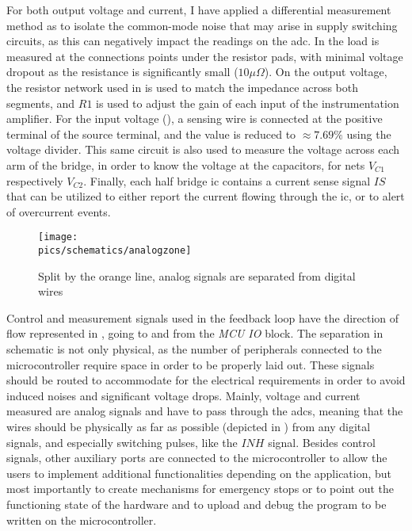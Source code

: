For both output voltage and current, I have applied a differential measurement method as to isolate the common-mode noise that may arise in supply switching circuits, as this can negatively impact the readings on the \gls{adc}.
In  the load is measured at the connections points under the resistor pads, with minimal voltage dropout as the resistance is significantly small ($10\mu \Omega$).
On the output voltage, the resistor network used in  is used to match the impedance across both segments, and $R1$ is used to adjust the gain of each input of the instrumentation amplifier.
For the input voltage (), a sensing wire is connected at the positive terminal of the source terminal, and the value is reduced to $\approx 7.69\%$ using the voltage divider.
This same circuit is also used to measure the voltage across each arm of the bridge, in order to know the voltage at the capacitors, for nets $V_{C1}$ respectively $V_{C2}$.
Finally, each half bridge \gls{ic} contains a current sense signal $IS$ that can be utilized to either report the current flowing through the \gls{ic}, or to alert of overcurrent events.

\begin{figure}[!ht]
    \begin{center}\texttt{[image: \\pics/schematics/analogzone]}\end{center}
    \caption{Split by the orange line, analog signals are separated from digital wires}
    \label{fig:analogzone}
\end{figure}

Control and measurement signals used in the feedback loop have the direction of flow represented in , going to and from the \textit{MCU IO} block.
The separation in schematic is not only physical, as the number of peripherals connected to the microcontroller require space in order to be properly laid out.
These signals should be routed to accommodate for the electrical requirements in order to avoid induced noises and significant voltage drops.
Mainly, voltage and current measured are analog signals and have to pass through the \gls{adc}s, meaning that the wires should be physically as far as possible (depicted in ) from any digital signals, and especially switching pulses, like the $INH$ signal\cite{zumbahlen2007basic}. 
Besides control signals, other auxiliary ports are connected to the microcontroller to allow the users to implement additional functionalities depending on the application, but most importantly to create mechanisms for emergency stops or to point out the functioning state of the hardware and to upload and debug the program to be written on the microcontroller.

